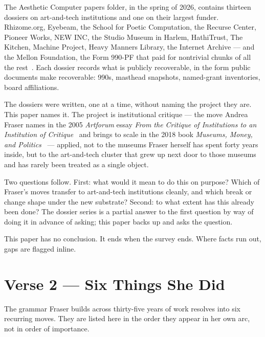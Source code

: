 \documentclass[10pt,letterpaper,twocolumn]{article}
\begin{document}
The Aesthetic Computer papers folder, in the spring of 2026, contains thirteen dossiers on art-and-tech institutions and one on their largest funder. Rhizome.org, Eyebeam, the School for Poetic Computation, the Recurse Center, Pioneer Works, NEW INC, the Studio Museum in Harlem, HathiTrust, The Kitchen, Machine Project, Heavy Manners Library, the Internet Archive --- and the Mellon Foundation, the Form 990-PF that paid for nontrivial chunks of all the rest~\citep{ac2026rhizome,ac2026eyebeam,ac2026sfpc,ac2026recurse,ac2026pioneerworks,ac2026newinc,ac2026studiomuseum,ac2026hathitrust,ac2026thekitchen,ac2026machineproject,ac2026heavymanners,ac2026internetarchive,ac2026mellon}. Each dossier records what is publicly recoverable, in the form public documents make recoverable: 990s, masthead snapshots, named-grant inventories, board affiliations.

The dossiers were written, one at a time, without naming the project they are. This paper names it. The project is institutional critique --- the move Andrea Fraser names in the 2005 \emph{Artforum} essay \emph{From the Critique of Institutions to an Institution of Critique}~\citep{fraser2005critique} and brings to scale in the 2018 book \emph{Museums, Money, and Politics}~\citep{fraser2018museums} --- applied, not to the museums Fraser herself has spent forty years inside, but to the art-and-tech cluster that grew up next door to those museums and has rarely been treated as a single object.

Two questions follow. First: what would it mean to do this on purpose? Which of Fraser's moves transfer to art-and-tech institutions cleanly, and which break or change shape under the new substrate? Second: to what extent has this already been done? The dossier series is a partial answer to the first question by way of doing it in advance of asking; this paper backs up and asks the question.

This paper has no conclusion. It ends when the survey ends. Where facts run out, gaps are flagged inline.

\section{Verse 2 --- Six Things She Did}

The grammar Fraser builds across thirty-five years of work resolves into six recurring moves. They are listed here in the order they appear in her own arc, not in order of importance.
\end{document}
